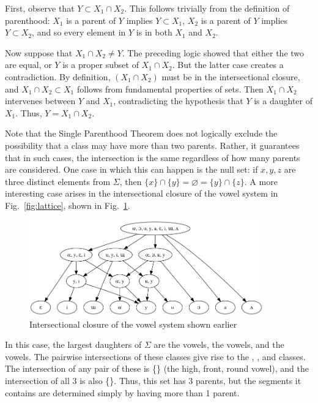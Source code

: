 \documentclass[11pt, oneside]{article}   	%
\begin{document}
First, observe that $Y \subset X_1 \cap X_2$. This follows trivially from the definition of parenthood: $X_1$ is a parent of $Y$ implies $Y \subset X_1$, $X_2$ is a parent of $Y$ implies $Y \subset X_2$, and so every element in $Y$ is in both $X_1$ and $X_2$.

Now suppose that $X_1 \cap X_2 \neq Y$. The preceding logic showed that either the two are equal, or $Y$ is a proper subset of $X_1 \cap X_2$. But the latter case creates a contradiction. By definition, $(X_1 \cap X_2)$ must be in the intersectional closure, and $X_1 \cap X_2 \subset X_1$ follows from fundamental properties of sets. Then $X_1 \cap X_2$ intervenes between $Y$ and $X_1$, contradicting the hypothesis that $Y$ is a daughter of $X_1$. Thus, $Y = X_1 \cap X_2$.
	
\vspace{\baselineskip} Note that the Single Parenthood Theorem does not logically exclude the possibility that a class may have more than two parents. Rather, it guarantees that in such cases, the intersection is the same regardless of how many parents are considered. One case in which this can happen is the null set: if $x, y, z$ are three distinct elements from $\Sigma$, then $\{ x \} \cap \{ y \} = \varnothing = \{ y \} \cap \{ z \}$. A more interesting case arises in the intersectional closure of the vowel system in Fig.~\ref{fig:lattice}, shown in Fig.~\ref{fig:closure}. 

\begin{figure}[h]
\includegraphics[width=0.9\textwidth]{vowelHarmony_closure.png}
\caption{Intersectional closure of the vowel system shown earlier}
\label{fig:closure}
\end{figure}

In this case, the largest daughters of $\Sigma$ are the  vowels, the  vowels, and the  vowels. The pairwise intersections of these classes give rise to the , , and  classes. The intersection of any pair of these is \{\} (the high, front, round vowel), and the intersection of all 3 is also \{\}. Thus, this set has 3 parents, but the segments it contains are determined simply by having more than 1 parent.
\end{document}
